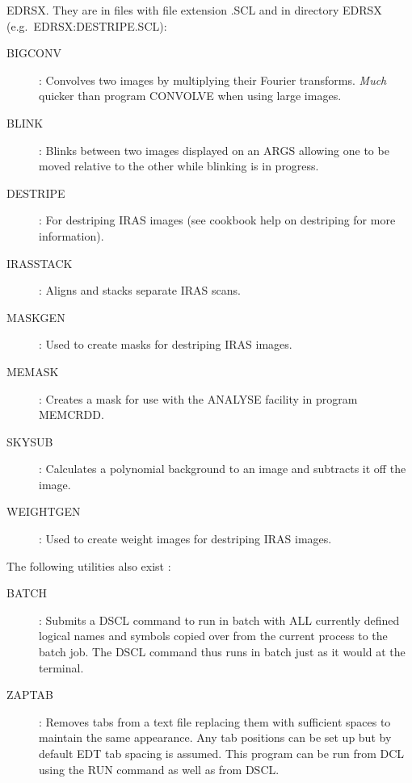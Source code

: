 EDRSX.
They are in files with file extension .SCL and in directory EDRSX (e.g.\
EDRSX:DESTRIPE.SCL):
\begin{description}
\item [BIGCONV]: Convolves two images by multiplying their Fourier transforms.
{\em Much} quicker than program CONVOLVE when using large images.
\item [BLINK]: Blinks between two images displayed on an ARGS allowing one to
be moved relative to the other while blinking is in progress.
\item [DESTRIPE]: For destriping IRAS images (see cookbook help on destriping
for more information).
\item [IRASSTACK]: Aligns and stacks separate IRAS scans.
\item [MASKGEN]: Used to create masks for destriping IRAS images.
\item [MEMASK]: Creates a mask for use with the ANALYSE facility in program
MEMCRDD.
\item [SKYSUB]: Calculates a polynomial background to an image and subtracts
it off the image.
\item [WEIGHTGEN]: Used to create weight images for destriping IRAS images.
\end{description}
The following utilities also exist :
\begin{description}
\item[BATCH]: Submits a DSCL command to run in batch with ALL currently defined
logical names and symbols copied over from the current process to the batch job.
The DSCL command thus runs in batch just as it would at the terminal.
\item[ZAPTAB]: Removes tabs from a text file replacing them with sufficient
spaces to maintain the same appearance.
Any tab positions can be set up but by default EDT tab spacing is assumed.
This program can be run from DCL using the RUN command as well as from DSCL.
\end{description}
